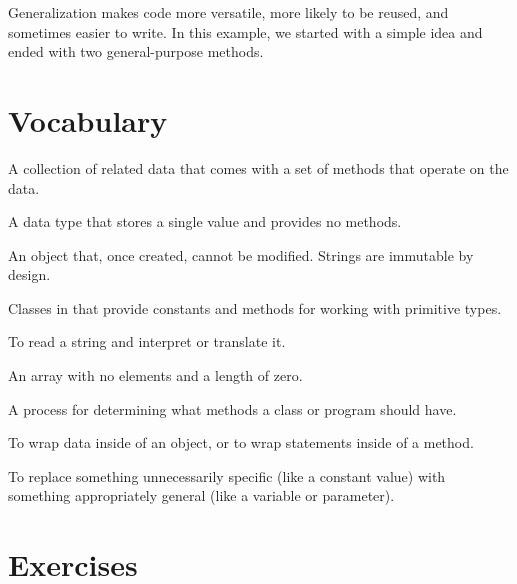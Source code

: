 Generalization makes code more versatile, more likely to be reused, and sometimes easier to write.
In this example, we started with a simple idea and ended with two general-purpose methods.




\section{Vocabulary}

\begin{description}

A collection of related data that comes with a set of methods that operate on the data.

A data type that stores a single value and provides no methods.

An object that, once created, cannot be modified.
Strings are immutable by design.

Classes in  that provide constants and methods for working with primitive types.

To read a string and interpret or translate it.

An array with no elements and a length of zero.

A process for determining what methods a class or program should have.

To wrap data inside of an object, or to wrap statements inside of a method.

To replace something unnecessarily specific (like a constant value) with something appropriately general (like a variable or parameter).

\end{description}


\section{Exercises}

